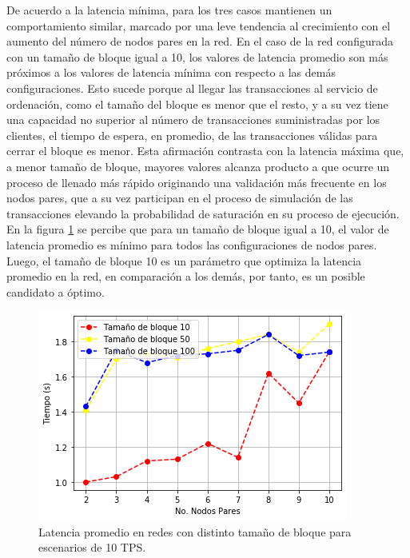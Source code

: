 De acuerdo a la latencia m\'inima, para los tres casos mantienen un comportamiento similar, marcado por una leve tendencia al crecimiento con el aumento del n\'umero de nodos pares en la red. En el caso de la red configurada con un tama\~no de bloque igual a 10, los valores de latencia promedio son m\'as pr\'oximos a los valores de latencia m\'inima con respecto a las dem\'as configuraciones. Esto sucede porque al llegar las transacciones al servicio de ordenaci\'on, como el tama\~no del bloque es menor que el resto, y a su vez tiene una capacidad no superior al n\'umero de transacciones suministradas por los clientes, el tiempo de espera, en promedio, de las transacciones v\'alidas para cerrar el bloque es menor. Esta afirmaci\'on contrasta con la latencia m\'axima que, a menor tama\~no de bloque, mayores valores alcanza producto a que ocurre un proceso de llenado m\'as r\'apido originando una validaci\'on m\'as frecuente en los nodos pares, que a su vez participan en el proceso de simulaci\'on de las transacciones elevando la probabilidad de saturaci\'on en su proceso de ejecuci\'on.\\

En la figura \ref{ComparacionLatencia10TPS} se percibe que para un tama\~no de bloque igual a 10, el valor de latencia promedio es m\'inimo para todos las configuraciones de nodos pares. Luego, el tama\~no de bloque 10 es un par\'ametro que optimiza la latencia promedio en la red, en comparaci\'on a los dem\'as, por tanto, es un posible candidato a \'optimo.\\

\begin{figure}[h]
\centering
\includegraphics[scale=0.5]{Graphics/ComparacionLatencia10TPS.png}
\caption{Latencia promedio en redes con distinto tama\~no de bloque para escenarios de 10 TPS.}
\label{ComparacionLatencia10TPS}
\end{figure}


